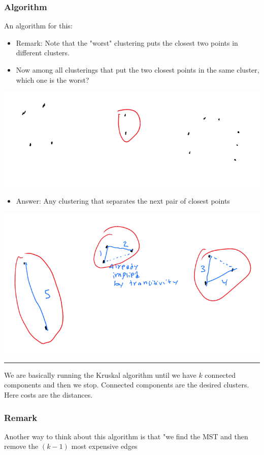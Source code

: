 \documentclass[11pt]{article}
\begin{document}
\subsubsection{Algorithm}
\label{sec:orgb76d271}
An algorithm for this: 
\begin{itemize}
\item Remark: Note that the "worst" clustering puts the closest two points in different clusters.
\item Now among all clusterings that put the two closest points in the same cluster, which one is the worst?
\end{itemize}
\begin{center}
\includegraphics[width=.9\linewidth]{./Images/i57.png}
\end{center}
\begin{itemize}
\item Answer: Any clustering that separates the next pair of closest points
\end{itemize}
\begin{center}
\includegraphics[width=.9\linewidth]{./Images/i58.png}
\end{center}

\noindent\rule{\textwidth}{0.5pt}
We are basically running the Kruskal algorithm until we have \(k\) connected components and then we stop. Connected components are the desired clusters. Here costs are the distances. 
\subsubsection{Remark}
\label{sec:orgf601601}
Another way to think about this algorithm is that "we find the MST and then remove the \((k-1)\) most expensive edges
\end{document}
